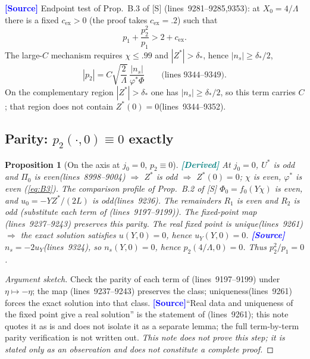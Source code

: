 \documentclass[11pt,a4paper]{article}
\newtheorem{proposition}[theorem]{Proposition}
\theoremstyle{definition}
\theoremstyle{remark}
\newcommand{\lnos}[1]{(lines~#1)}
\newcommand{\ORIG}{\textcolor{blue}{\textbf{[Source]}}}
\newcommand{\DER}{\textcolor{teal}{\textbf{[Derived]}}}
\newcommand{\notproved}{\emph{This note does not prove this step; it is stated only as an observation
and does not constitute a complete proof.}}
\begin{document}
\ORIG
Endpoint test of Prop.~B.3 of [S] \lnos{9281--9285,9353}: at $X_0=4/\Lambda$ there is a fixed
$c_{\mathrm{ex}}>0$ (the proof takes $c_{\mathrm{ex}}=.2$) such that
\begin{equation}
\label{eq:B19}
p_1+\frac{p_2^2}{p_1}>2+c_{\mathrm{ex}}.
\end{equation}
The large-$C$ mechanism requires $\chi\le .99$ and $|Z^*|>\delta_*$, hence $|n_s|\ge\delta_*/2$,
\begin{equation}
\label{eq:p2C}
|p_2|=C\sqrt{\frac{2}{\Lambda}}\,\frac{|n_s|}{\varphi^*\Phi}
\qquad\text{\lnos{9344--9349}}.
\end{equation}
On the complementary region $|Z^*|>\delta_*$ one has $|n_s|\ge\delta_*/2$, so this term carries $C$;
that region does not contain $Z^*(0)=0$\lnos{9344--9352}.

\subsection{Parity: \texorpdfstring{$p_2(\cdot,0)\equiv 0$}{p\_2(.,0)=0} exactly}
\label{sec:note3-parity}

\begin{proposition}[On the axis at $j_0=0$, $p_2\equiv 0$]
\label{prop:p2zero}
\DER
At $j_0=0$, $U^*$ is odd and $\Pi_0$ is even\lnos{8998--9004}
$\Rightarrow$ $Z^*$ is odd $\Rightarrow$ $Z^*(0)=0$;
$\chi$ is even, $\varphi^*$ is even (\eqref{eq:B3}).
The comparison profile of Prop.~B.2 of [S] $\Phi_0=f_0(Y\chi)$ is even,
and $u_0=-YZ^*/(2L)$ is odd\lnos{9236}.
The remainders $R_1$ is even and $R_2$ is odd (substitute each term of \lnos{9197--9199}).
The fixed-point map \lnos{9237--9243} preserves this parity.
The real fixed point is unique\lnos{9261}
$\Rightarrow$ the exact solution satisfies $u(Y,0)=0$, hence $u_Y(Y,0)=0$.
\ORIG
$n_s=-2u_Y$\lnos{9324}, so $n_s(Y,0)=0$,
hence $p_2(4/\Lambda,0)=0$. Thus $p_2^2/p_1=0$.
\end{proposition}

\begin{proof}[Argument sketch]
Check the parity of each term of \lnos{9197--9199} under $\eta\mapsto-\eta$;
the map \lnos{9237--9243} preserves the class; uniqueness\lnos{9261} forces the exact solution into
that class.
\ORIG ``Real data and uniqueness of the fixed point give a real solution'' is the statement of
\lnos{9261}; this note quotes it as is and does not isolate it as a separate lemma; the full term-by-term
parity verification is not written out.
\notproved
\end{proof}
\end{document}
